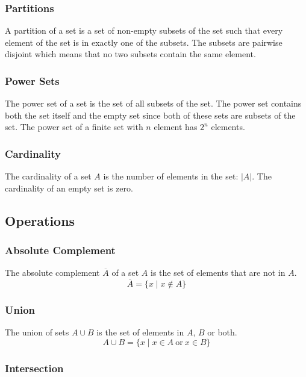 \documentclass{article}
\begin{document}
\subsubsection{Partitions}

A partition of a set is a set of non-empty subsets of the set such that every element of the set is in exactly one of the subsets. The subsets are pairwise disjoint which means that no two subsets contain the same element.

\subsubsection{Power Sets}

The power set of a set is the set of all subsets of the set. The power set contains both the set itself and the empty set since both of these sets are subsets of the set. The power set of a finite set with $n$ element has $2^n$ elements.

\subsubsection{Cardinality}

The cardinality of a set $A$ is the number of elements in the set: $\vert A \vert$. The cardinality of an empty set is zero.

\subsection{Operations}

\subsubsection{Absolute Complement}

The absolute complement $\overline{A}$ of a set $A$ is the set of elements that are not in $A$.
\[\overline{A}= \{x \mid x \notin A\} \]

\subsubsection{Union}

The union of sets $A \cup B$ is the set of elements in $A$, $B$ or both.
\[A \cup B = \{x \mid x \in A \ \mathrm{or} \ x \in B\} \]

\subsubsection{Intersection}
\end{document}
